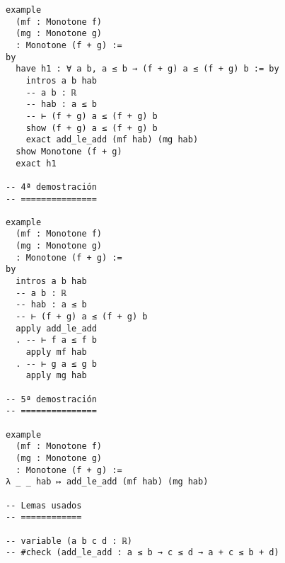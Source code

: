 \begin{verbatim}
example
  (mf : Monotone f)
  (mg : Monotone g)
  : Monotone (f + g) :=
by
  have h1 : ∀ a b, a ≤ b → (f + g) a ≤ (f + g) b := by
    intros a b hab
    -- a b : ℝ
    -- hab : a ≤ b
    -- ⊢ (f + g) a ≤ (f + g) b
    show (f + g) a ≤ (f + g) b
    exact add_le_add (mf hab) (mg hab)
  show Monotone (f + g)
  exact h1

-- 4ª demostración
-- ===============

example
  (mf : Monotone f)
  (mg : Monotone g)
  : Monotone (f + g) :=
by
  intros a b hab
  -- a b : ℝ
  -- hab : a ≤ b
  -- ⊢ (f + g) a ≤ (f + g) b
  apply add_le_add
  . -- ⊢ f a ≤ f b
    apply mf hab
  . -- ⊢ g a ≤ g b
    apply mg hab

-- 5ª demostración
-- ===============

example
  (mf : Monotone f)
  (mg : Monotone g)
  : Monotone (f + g) :=
λ _ _ hab ↦ add_le_add (mf hab) (mg hab)

-- Lemas usados
-- ============

-- variable (a b c d : ℝ)
-- #check (add_le_add : a ≤ b → c ≤ d → a + c ≤ b + d)
\end{verbatim}

